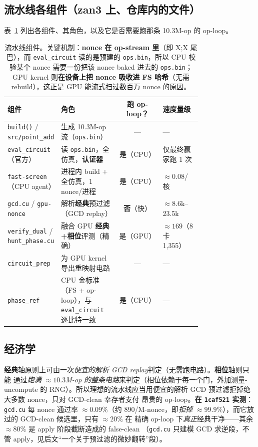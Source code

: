 \documentclass[11pt]{ctexart}
\let\c\lstinline
\begin{document}
\subsection{流水线各组件（zan3 上、仓库内的文件）}
表~\ref{tab:components} 列出各组件、其角色，以及它是否需要跑那条 10.3M-op 的 op-loop。
\begin{table}[h]\centering\small
\begin{tabular}{@{}p{0.27\linewidth}p{0.30\linewidth}cp{0.20\linewidth}@{}}
\toprule
组件 & 角色 & 跑 op-loop？ & 速度量级 \\ \midrule
\c{build()} / \c{src/point_add} & 生成 10.3M-op 流（\texttt{ops.bin}） & — & — \\
\c{eval_circuit}（官方） & 读 \texttt{ops.bin}，全仿真，\textbf{认证器} & 是（CPU） & 仅最终赢家跑 1 次 \\
\c{fast-screen}（CPU agent） & 进程内 build + 全仿真，1 nonce/进程 & 是（CPU） & $\approx 0.08$/核 \\
\c{gcd.cu} / \c{gpu-nonce} & 解析\textbf{经典}预过滤（GCD replay） & \textbf{否}（快） & $\approx$8.6k--23.5k \\
\c{verify_dual} / \c{hunt_phase.cu} & 融合 GPU \textbf{经典+相位}评测（精确） & 是（GPU） & $\approx 169$（8 卡 1{,}355）\\
\c{circuit_prep} & 为 GPU kernel 导出重映射电路 & — & — \\
\c{phase_ref} & CPU 金标准（FS + op-loop），与 \c{eval_circuit} 逐比特一致 & 是（CPU） & — \\
\bottomrule
\end{tabular}
\caption{流水线组件。关键机制：\textbf{nonce 在 op-stream 里}（即 X;X 尾巴），而 \c{eval_circuit}
读的是预建的 \texttt{ops.bin}，所以 CPU 校验某个 nonce 需要一份把该 nonce baked 进去的
\texttt{ops.bin}；GPU kernel 则\textbf{在设备上把 nonce 吸收进 FS 哈希}（无需 rebuild），这正是
GPU 能流式扫过数百万 nonce 的原因。}
\label{tab:components}
\end{table}

\subsection{经济学}
\textbf{经典}轴原则上可由一次\emph{便宜的解析 GCD replay}判定（无需跑电路）。\textbf{相位}轴则只能
通过\emph{跑满 $\approx 10.3$M-op 的整条电路}来判定（相位依赖于每一个门，外加测量-uncompute 的
RNG）。所以理想的流水线应当用便宜的解析 GCD 预过滤拒掉绝大多数 nonce，只对 GCD-clean 幸存者支付
昂贵的 op-loop。\textbf{在 \texttt{1caf521} 实测}：\c{gcd.cu} 每 nonce 通过率 $\approx 0.09\%$（约
$890$/M-nonce，即\emph{拒掉 $\approx 99.9\%$}），而它放过的 GCD-clean 候选里，只有 $\approx 20\%$ 在
精确 op-loop 下\emph{真正}经典干净——其余 $\approx 80\%$ 是 apply 阶段截断造成的 false-clean
（\c{gcd.cu} 只建模 GCD 求逆段，不管 apply，见后文``一个关于预过滤的微妙翻转''段）。
\end{document}
